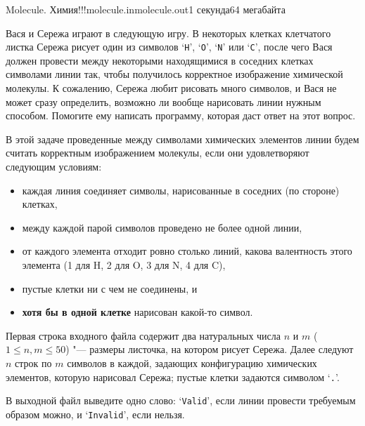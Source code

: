 \begin{problem}{Molecule. Химия!!!}{molecule.in}{molecule.out}{1 секунда}{64 мегабайта}

Вася и Сережа играют в следующую игру. В некоторых клетках клетчатого листка Сережа рисует один из 
символов `\texttt{H}', `\texttt{O}', `\texttt{N}' или `\texttt{C}', после чего Вася должен провести между некоторыми
находящимися в соседних клетках символами линии так, чтобы получилось корректное изображение
химической молекулы. К сожалению, Сережа любит рисовать много символов, и Вася не может сразу
определить, возможно ли вообще нарисовать линии нужным способом. Помогите ему написать программу,
которая даст ответ на этот вопрос.

В этой задаче проведенные между символами химических элементов линии будем считать корректным изображением молекулы,
если они удовлетворяют следующим условиям:

\begin{itemize}
  \item каждая линия соединяет символы, нарисованные в соседних (по стороне) клетках, 
  \item между каждой парой символов проведено не более одной линии,
  \item от каждого элемента отходит ровно столько линий, какова валентность этого элемента (1 для H, 2 для O, 3 для N, 4 для C), 
  \item пустые клетки ни с чем не соединены, и
  \item {\bf хотя бы в одной клетке} нарисован какой-то символ.
\end{itemize}

\InputFile

Первая строка входного файла содержит два натуральных числа $n$ и $m$ ($1 \le n,m \le 50$) "--- размеры листочка, на котором рисует Сережа.
Далее следуют $n$ строк по $m$ символов в каждой, задающих конфигурацию химических элементов, которую нарисовал Сережа;
пустые клетки задаются символом `\texttt{.}'.

\OutputFile

В выходной файл выведите одно слово: `\texttt{Valid}', если линии провести требуемым образом можно, и `\texttt{Invalid}',
если нельзя.

\Example

 \begin{example}
%
%
\end{example}

\end{problem}